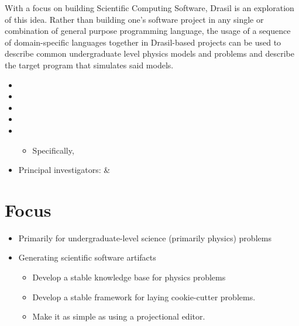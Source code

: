 With a focus on building Scientific Computing Software,
Drasil\thinspace\cite{Drasil2021} is an exploration of this idea. Rather than
building one's software project in any single or combination of general purpose
programming language, the usage of a sequence of domain-specific languages
together in Drasil-based projects can be used to describe common undergraduate
level physics models and problems and describe the target program that simulates
said models.

\begin{itemize}
    \item {}
    \item {}
    \item {}
    \item {}
    \item {}
          \begin{itemize}
              \item Specifically, 
          \end{itemize}
    \item Principal investigators:  \& 
\end{itemize}

\section{Focus}

\begin{itemize}
    \item Primarily for undergraduate-level science (primarily physics) problems
    \item Generating scientific software artifacts
          \begin{itemize}
              \item Develop a stable knowledge base for physics problems
              \item Develop a stable framework for laying cookie-cutter
                    problems.
              \item Make it as simple as using a projectional editor.
          \end{itemize}
\end{itemize}

